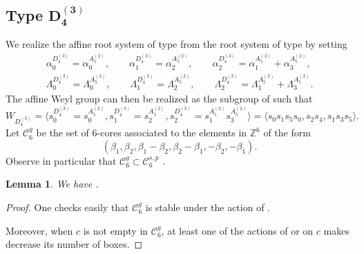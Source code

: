 \documentclass[pdftex]{sigma}
\newtheorem{Lemma}[Theorem]{Lemma}
\numberwithin{equation}{section}
\begin{document}
\subsection[Type D\_4\^{}(3)]{Type $\boldsymbol{D_{4}^{(3)}}$}

We realize the affine root system of type  from the root system
of type  by setting%
\begin{gather}
\alpha _{0}^{D_{4}^{(3)}}=\alpha _{0}^{A_{5}^{(2)}}, \qquad
\alpha _{1}^{D_{4}^{(3)}}=\alpha _{2}^{A_{5}^{(2)}}, \qquad
\alpha _{2}^{D_{4}^{(3)}}=\alpha _{1}^{A_{5}^{(2)}}+\alpha _{3}^{A_{5}^{(2)}},\nonumber\\
\Lambda _{0}^{D_{4}^{(3)}}=\Lambda _{0}^{A_{5}^{(2)}}, \qquad
\Lambda _{1}^{D_{4}^{(3)}}=\Lambda _{2}^{A_{5}^{(2)}}, \qquad
\Lambda _{2}^{D_{4}^{(3)}}=\Lambda _{1}^{A_{5}^{(2)}}+\Lambda
_{3}^{A_{5}^{(2)}}.\label{relaDG}
\end{gather}
The affine Weyl group  can then be realized as the subgroup
of  such that
\begin{equation*}
W_{D_{4}^{(3)}}=\bigl\langle
s_{0}^{D_{4}^{(3)}}=s_{0}^{A_{5}^{(2)}},s_{1}^{D_{4}^{(3)}}=s_{2}^{A_{5}^{(2)}},s_{2}^{D_{4}^{(3)}}=s_{1}^{A_{5}^{(2)}}s_{3}^{A_{5}^{(2)}}\bigr\rangle =\langle s_{0}s_{1}s_{5}s_{0},s_{2}s_{4},s_{1}s_{3}s_{5}\rangle .
\end{equation*}%
Let $\mathcal{C}_{6}^{g}$ be the set of $6$-cores associated to the elements
in $\mathbb{Z}^{6}$ of the form%
\begin{equation}\label{eq:d43}
(\beta _{1},\beta _{2},\beta _{1}-\beta _{2},\beta _{2}-\beta _{1},-\beta
_{2},-\beta _{1}).
\end{equation}%
Observe in particular that $\mathcal{C}_{6}^{g}\subset \mathcal{C}_{6}^{s,p}$%
.

\begin{Lemma}
	We have .
\end{Lemma}

\begin{proof}
	One checks easily that $\mathcal{C}_{6}^{g}$ is stable under the action of .

Moreover, when $c$ is not empty in $\mathcal{C}_{6}^{g}$,
	at least one of the actions of  or 
	on $c$ makes decrease its number of boxes.
\end{proof}
\end{document}
